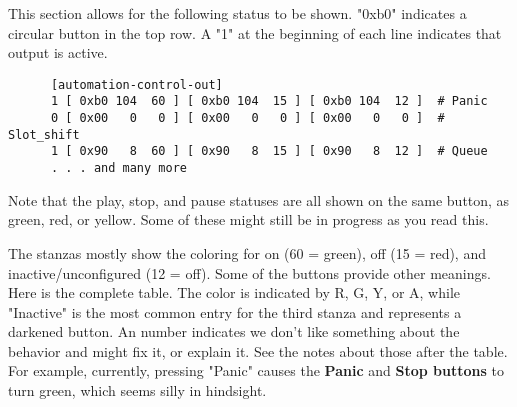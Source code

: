    This section allows for the following status to be shown. "0xb0" indicates
   a circular button in the top row.  A "1" at the beginning of each line
   indicates that output is active.

   \begin{verbatim}
      [automation-control-out]
      1 [ 0xb0 104  60 ] [ 0xb0 104  15 ] [ 0xb0 104  12 ]  # Panic
      0 [ 0x00   0   0 ] [ 0x00   0   0 ] [ 0x00   0   0 ]  # Slot_shift
      1 [ 0x90   8  60 ] [ 0x90   8  15 ] [ 0x90   8  12 ]  # Queue
      . . . and many more
   \end{verbatim}

   Note that the play, stop, and pause statuses are all shown on the same
   button, as green, red, or yellow.  Some of these might still be in progress
   as you read this.

   The stanzas mostly show the coloring for on (60 = green), off (15 = red),
   and inactive/unconfigured (12 = off).
   Some of the buttons provide other meanings.
   Here is the complete table. The color is indicated by R, G, Y, or A,
   while "Inactive"
   is the most common entry for the third stanza and represents a darkened button.
   An number indicates we don't like something about the behavior and
   might fix it, or explain it. See the notes about those after the table.
   For example, currently, pressing "Panic" causes the \textbf{Panic}
   and \textbf{Stop buttons} to turn green, which seems silly in hindsight.

